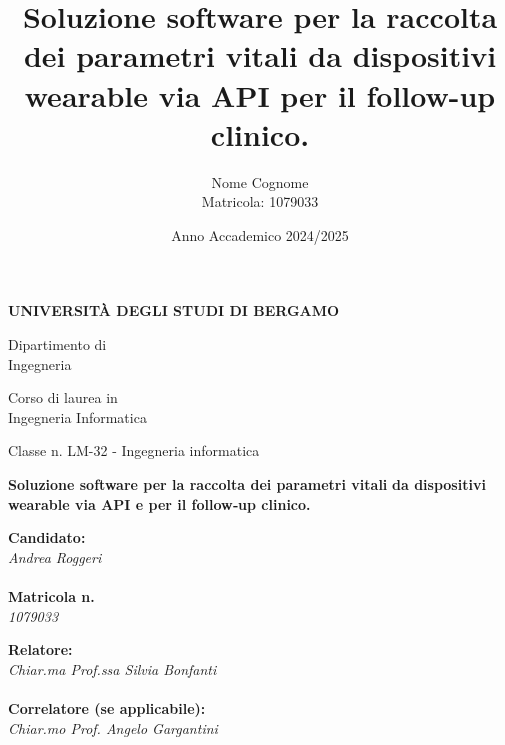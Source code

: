 \documentclass[12pt,a4paper,oneside]{report}
\title{\Huge\textbf{Soluzione software per la raccolta dei parametri vitali da dispositivi wearable via API per il follow-up clinico.}}
\author{Nome Cognome\\Matricola: 1079033}
\date{Anno Accademico 2024/2025}
\begin{document}
\begin{titlepage}
    \begin{center}
        {\fontsize{18}{22}\bfseries UNIVERSITÀ DEGLI STUDI DI BERGAMO}
    \end{center}

    \vspace{1cm}

    \begin{flushleft}
        {\fontsize{14}{18} Dipartimento di}\\
        {\fontsize{14}{18} Ingegneria}

        \vspace{1cm}

        {\fontsize{14}{18} Corso di laurea in}\\
        {\fontsize{14}{18} Ingegneria Informatica}

        \vspace{0.5cm}

        {\fontsize{14}{18} Classe n. LM-32 - Ingegneria informatica}
    \end{flushleft}

    \vspace{2.5cm}

    \begin{center}
        {\fontsize{20}{24}\bfseries Soluzione software per la raccolta dei parametri vitali}
        {\fontsize{20}{24}\bfseries da dispositivi wearable via API e per il follow‑up clinico.}
    \end{center}

    \vfill

    \begin{flushleft}
        \begin{minipage}[t]{0.47\textwidth}
            {\fontsize{12}{14}\selectfont\textbf{Candidato:}}\\
            {\fontsize{14}{18}\selectfont\textit{Andrea Roggeri}}\\
            \vspace{0.5cm}\\
            {\fontsize{12}{14}\selectfont\textbf{Matricola n.}}\\
            {\fontsize{14}{18}\selectfont\textit{1079033}}
        \end{minipage}
        \hfill
        \begin{minipage}[t]{0.47\textwidth}
            {\fontsize{12}{14}\selectfont\textbf{Relatore:}}\\
            {\fontsize{14}{18}\selectfont\textit{Chiar.ma Prof.ssa Silvia Bonfanti}}\\
            \vspace{0.5cm}\\
            {\fontsize{12}{14}\selectfont\textbf{Correlatore (se applicabile):}}\\
            {\fontsize{14}{18}\selectfont\textit{Chiar.mo Prof. Angelo Gargantini}}
        \end{minipage}\end{flushleft}


\end{titlepage}
\end{document}
